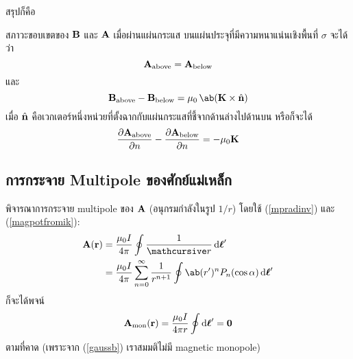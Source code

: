สรุปก็คือ
\begin{lawbox}{สภาวะขอบเขตของ $\mathbf{B}$ และ $\mathbf{A}$ เมื่อผ่านแผ่นกระแส}
    บนแผ่นประจุที่มีความหนาแน่นเชิงพื้นที่ $\sigma$ จะได้ว่า
    \begin{equation}
        \mathbf{A}_{\mathrm{above}}=\mathbf{A}_{\mathrm{below}}
    \end{equation}
    และ
    \begin{equation}
        \vb{B}_\txt{above}-\vb{B}_\txt{below}=\mu_0\,\ab(\vb{K}\times\vu{n})
    \end{equation}
    เมื่อ $\hat{\mathbf{n}}$ คือเวกเตอร์หนึ่งหน่วยที่ตั้งฉากกับแผ่นกระแสที่ชี้จากด้านล่างไปด้านบน หรือก็จะได้
    \begin{equation}
        \pdv{\mathbf{A}_{\mathrm{above}}}{n}-\pdv{\mathbf{A}_{\mathrm{below}}}{n}=-\mu_0\mathbf{K}
    \end{equation}
\end{lawbox}

\subsection{การกระจาย Multipole ของศักย์แม่เหล็ก}
พิจารณาการกระจาย multipole ของ $\mathbf{A}$ (อนุกรมกำลังในรูป $1 / r$) โดยใช้ (\ref{mpradinv}) และ (\ref{magpotfromik}):
\begin{align*}
    \vb{A}(\vb{r}) &= \frac{\mu_0I}{4\pi}\oint \frac{1}{\rad}\odif{\vbs{\ell}'}\\
    &=\frac{\mu_0I}{4\pi} \sum_{n=0}^{\infty}\frac{1}{r^{n+1}}\oint\ab(r')^nP_n(\cos\alpha)\odif{\vbs{\ell}'}
\end{align*}
ก็จะได้พจน์
\[
\vb{A}_\txt{mon}(\vb{r}) = \frac{\mu_0I}{4\pi r}\oint\odif{\vbs{\ell}'} = \vb{0}
\]
ตามที่คาด (เพราะจาก (\ref{gaussb}) เราสมมติไม่มี magnetic monopole)

